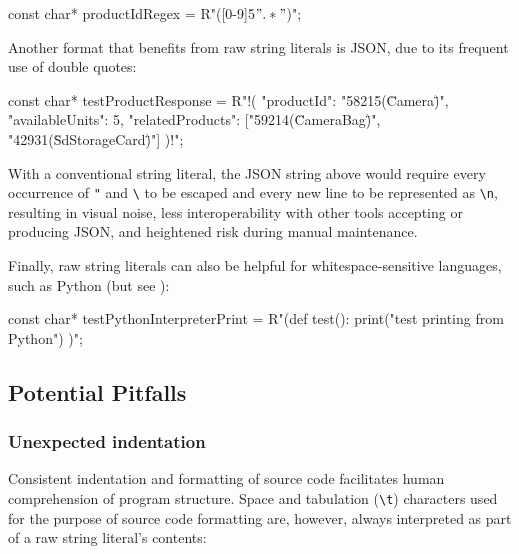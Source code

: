 \begin{emcppslisting}
const char* productIdRegex = R"([0-9]{5}\(".*"\))";
\end{emcppslisting}

\newpage%
\noindent Another format that benefits from raw string literals is JSON, due to
its frequent use of double quotes:

\begin{emcppslisting}
const char* testProductResponse = R"!(
{
    "productId": "58215(\"Camera\")",
    "availableUnits": 5,
    "relatedProducts": ["59214(\"CameraBag\")", "42931(\"SdStorageCard\")"]
})!";
\end{emcppslisting}

\noindent With a conventional string literal, the JSON string above would require
every occurrence of \lstinline!"! and \lstinline!\! to be escaped
and every new line to be represented as \lstinline!\n!, resulting
in visual noise, less interoperability with other tools accepting or
producing JSON, and heightened risk during manual maintenance.

Finally, raw string literals can also be helpful for
whitespace-sensitive languages, such as Python (but see ):

\begin{emcppslisting}
const char* testPythonInterpreterPrint = R"(def test():
    print("test printing from Python")
)";
\end{emcppslisting}


\subsection[Potential Pitfalls]{Potential Pitfalls}\label{potential-pitfalls-rawstringliteral}

\subsubsection[Unexpected indentation]{Unexpected indentation}\label{unexpected-indentation}

Consistent indentation and formatting of source code facilitates human
comprehension of program structure. Space and tabulation
(\lstinline!\t!) characters used for the
purpose of source code formatting are, however, always interpreted as
part of a raw string literal's contents:

